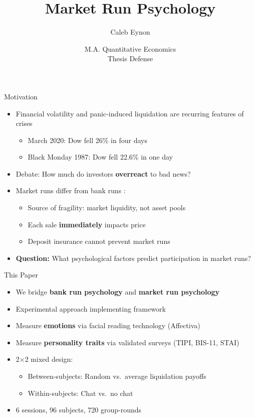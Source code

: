 \documentclass{beamer}
\title[Market Run Psychology]{Market Run Psychology}
\author[Eynon]{Caleb Eynon}
\institute[]{
  University of Alabama
}
\date[] %
{
M.A. Quantitative Economics\\
Thesis Defense
}
\begin{document}
\frame{\titlepage}


\begin{frame}{Motivation}
\begin{itemize}
    \item Financial volatility and panic-induced liquidation are recurring features of crises
    \begin{itemize}
        \item March 2020: Dow fell 26\% in four days
        \item Black Monday 1987: Dow fell 22.6\% in one day
    \end{itemize}
    \item Debate: How much do investors \textbf{overreact} to bad news?
    \item Market runs differ from bank runs \citep{bernardo2004liquidity}:
    \begin{itemize}
        \item Source of fragility: market liquidity, not asset pools
        \item Each sale \textbf{immediately} impacts price
        \item Deposit insurance cannot prevent market runs
    \end{itemize}
    \item \textbf{Question:} What psychological factors predict participation in market runs?
\end{itemize}
\end{frame}


\begin{frame}{This Paper}
\begin{itemize}
    \item We bridge \textbf{bank run psychology} and \textbf{market run psychology}
    \item Experimental approach implementing \cite{bernardo2004liquidity} framework
    \item Measure \textbf{emotions} via facial reading technology (Affectiva)
    \item Measure \textbf{personality traits} via validated surveys (TIPI, BIS-11, STAI)
    \item 2$\times$2 mixed design:
    \begin{itemize}
        \item Between-subjects: Random vs.\ average liquidation payoffs
        \item Within-subjects: Chat vs.\ no chat
    \end{itemize}
    \item 6 sessions, 96 subjects, 720 group-rounds
\end{itemize}
\end{frame}
\end{document}
